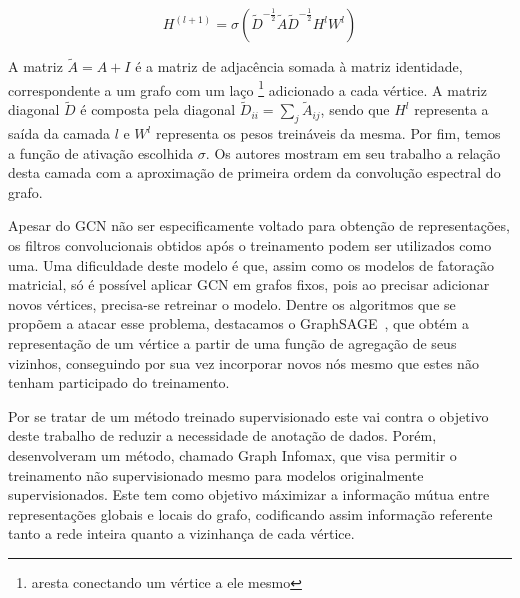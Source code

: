 \begin{equation} \label{eq:gcn_layer}
    H^{(l+1)} = \sigma (\tilde{D}^{-\frac{1}{2}} \tilde{A} \tilde{D}^{-\frac{1}{2}} H^l W^l)
\end{equation}

A matriz $\tilde{A} = A + I$ é a matriz de adjacência somada à matriz
identidade, correspondente a um grafo com um laço \footnote{aresta conectando um
vértice a ele mesmo} adicionado a cada vértice.
A matriz diagonal $\tilde{D}$ é composta pela diagonal
$\tilde{D}_{ii} = \sum_{j}\tilde{A}_{ij}$, sendo que $H^l$ representa a saída da
camada $l$ e $W^l$ representa os pesos treináveis da mesma.
Por fim, temos a função de ativação escolhida $\sigma$.
Os autores mostram em seu trabalho a relação desta camada com a aproximação de
primeira ordem da convolução espectral do grafo.

Apesar do GCN não ser especificamente voltado para obtenção de representações,
os filtros convolucionais obtidos após o treinamento podem ser utilizados como
uma.
Uma dificuldade deste modelo é que, assim como os modelos de fatoração matricial,
só é possível aplicar GCN em grafos fixos, pois ao precisar adicionar novos vértices,
precisa-se retreinar o modelo.
Dentre os algoritmos que se propõem a atacar esse problema, destacamos o
GraphSAGE~\cite{hamilton17}, que obtém a representação de um vértice a partir
de uma função de agregação de seus vizinhos, conseguindo por sua vez incorporar
novos nós mesmo que estes não tenham participado do treinamento.

Por se tratar de um método treinado supervisionado este vai contra o
objetivo deste trabalho de reduzir a necessidade de anotação de dados.
Porém, \citet{velickovic18} desenvolveram um método, chamado Graph Infomax, que
visa permitir o treinamento não supervisionado mesmo para modelos originalmente
supervisionados.
Este tem como objetivo máximizar a informação mútua entre representações globais e
locais do grafo, codificando assim informação referente tanto a rede inteira
quanto a vizinhança de cada vértice.
